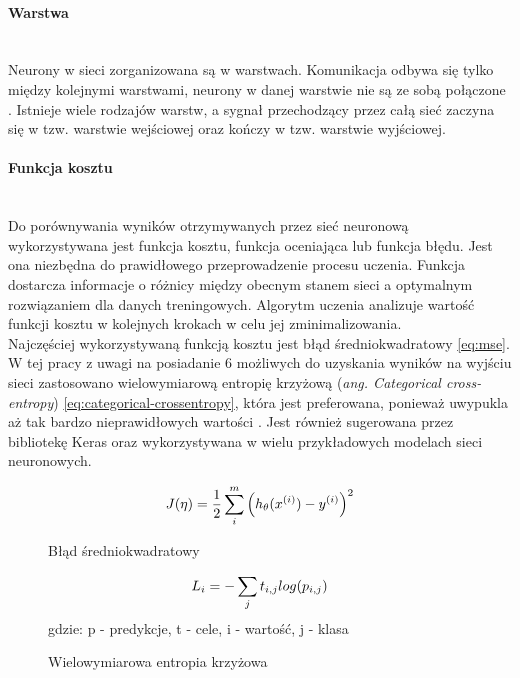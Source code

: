 \paragraph{Warstwa} \mbox{}\\
Neurony w sieci zorganizowana są w warstwach. Komunikacja odbywa się tylko między kolejnymi
warstwami, neurony w danej warstwie nie są ze sobą połączone \cite{CS231n, substBigConv}.
Istnieje wiele rodzajów warstw, a sygnał przechodzący przez całą sieć zaczyna się w tzw.
warstwie wejściowej oraz kończy w tzw. warstwie wyjściowej.

\paragraph{Funkcja kosztu} \mbox{}\\
Do porównywania wyników otrzymywanych przez sieć neuronową wykorzystywana jest funkcja kosztu,
funkcja oceniająca lub funkcja błędu. Jest ona niezbędna do prawidłowego przeprowadzenie
procesu uczenia. Funkcja dostarcza informacje o różnicy między obecnym
stanem sieci a optymalnym rozwiązaniem dla danych treningowych. Algorytm uczenia
analizuje wartość funkcji kosztu w kolejnych krokach w celu jej zminimalizowania.\\
Najczęściej wykorzystywaną funkcją kosztu jest błąd średniokwadratowy \ref{eq:mse}.
W tej pracy z uwagi na posiadanie 6 możliwych do uzyskania wyników na wyjściu sieci
zastosowano wielowymiarową entropię krzyżową (\textit{ang. Categorical cross-entropy}) \ref{eq:categorical-crossentropy},
która jest preferowana, ponieważ uwypukla aż tak bardzo nieprawidłowych wartości \cite{whyNotMSE}. Jest również
sugerowana przez bibliotekę Keras oraz wykorzystywana w wielu przykładowych modelach sieci neuronowych.
\begin{figure}[h!]
\renewcommand{\figurename}{Wzór}%
\begin{equation} \label{eq:mse}
J(\eta) = \frac {1}{2} \sum_{i}^{m} \Big(h_{\theta}(x^{(i)}) - y^{(i)} \Big)^2\\
\end{equation}
\caption{Błąd średniokwadratowy}
\end{figure}
\begin{figure}[h!]
\renewcommand{\figurename}{Wzór}%
\begin{equation} \label{eq:categorical-crossentropy}
L_{i} = - \sum_{j} t_{i,j} log(p_{i,j})\\
\end{equation}
\centering
gdzie: p - predykcje, t - cele, i - wartość, j - klasa
\caption{Wielowymiarowa entropia krzyżowa}
\end{figure}


